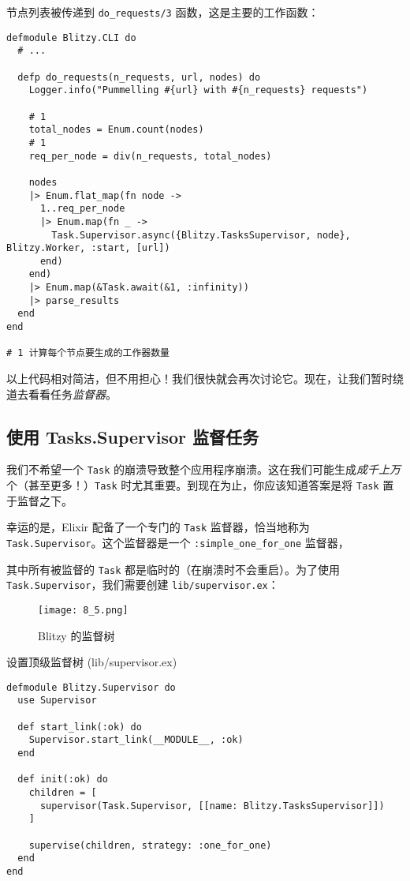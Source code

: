 节点列表被传递到 \texttt{do\_requests/3}
函数，这是主要的工作函数：

\begin{code}{}
\begin{verbatim}
defmodule Blitzy.CLI do
  # ...

  defp do_requests(n_requests, url, nodes) do
    Logger.info("Pummelling #{url} with #{n_requests} requests")

    # 1
    total_nodes = Enum.count(nodes)
    # 1
    req_per_node = div(n_requests, total_nodes)

    nodes
    |> Enum.flat_map(fn node ->
      1..req_per_node
      |> Enum.map(fn _ ->
        Task.Supervisor.async({Blitzy.TasksSupervisor, node}, Blitzy.Worker, :start, [url])
      end)
    end)
    |> Enum.map(&Task.await(&1, :infinity))
    |> parse_results
  end
end

# 1 计算每个节点要生成的工作器数量
\end{verbatim}
\end{code}

以上代码相对简洁，但不用担心！我们很快就会再次讨论它。现在，让我们暂时绕道去看看任务\emph{监督器}。

\subsection{使用 Tasks.Supervisor 监督任务}

我们不希望一个 \texttt{Task}
的崩溃导致整个应用程序崩溃。这在我们可能生成\emph{成千上万}个（甚至更多！）\texttt{Task}
时尤其重要。到现在为止，你应该知道答案是将
\texttt{Task} 置于监督之下。

幸运的是，Elixir 配备了一个专门的 \texttt{Task}
监督器，恰当地称为
\texttt{Task.Supervisor}。这个监督器是一个
\texttt{:simple\_one\_for\_one} 监督器，

其中所有被监督的 \texttt{Task}
都是临时的（在崩溃时不会重启）。为了使用
\texttt{Task.Supervisor}，我们需要创建
\texttt{lib/supervisor.ex}：

\begin{figure}[!ht]
    \centering
    \texttt{[image: 8\_5.png]}
    \caption{Blitzy 的监督树}
    \label{fig:8_5}
\end{figure}

 

\begin{code}{设置顶级监督树 (lib/supervisor.ex)}

\begin{verbatim}
defmodule Blitzy.Supervisor do
  use Supervisor

  def start_link(:ok) do
    Supervisor.start_link(__MODULE__, :ok)
  end

  def init(:ok) do
    children = [
      supervisor(Task.Supervisor, [[name: Blitzy.TasksSupervisor]])
    ]

    supervise(children, strategy: :one_for_one)
  end
end
\end{verbatim}
\end{code}

